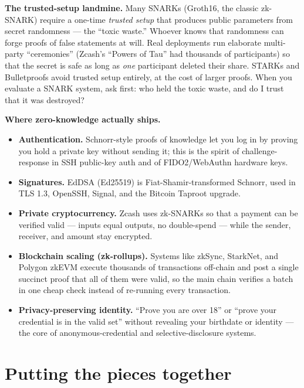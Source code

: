 \begin{trapbox}
\textbf{The trusted-setup landmine.} Many SNARKs (Groth16, the classic
zk-SNARK) require a one-time \emph{trusted setup} that produces public
parameters from secret randomness --- the ``toxic waste.'' Whoever knows that
randomness can forge proofs of false statements at will. Real deployments run
elaborate multi-party ``ceremonies'' (Zcash's ``Powers of Tau'' had thousands of
participants) so that the secret is safe as long as \emph{one} participant
deleted their share. STARKs and Bulletproofs avoid trusted setup entirely, at
the cost of larger proofs. When you evaluate a SNARK system, ask first: who held
the toxic waste, and do I trust that it was destroyed?
\end{trapbox}

\begin{applicationbox}
\textbf{Where zero-knowledge actually ships.}
\begin{itemize}
  \item \textbf{Authentication.} Schnorr-style proofs of knowledge let you log
  in by proving you hold a private key without sending it; this is the spirit of
  challenge-response in SSH public-key auth and of FIDO2/WebAuthn hardware keys.
  \item \textbf{Signatures.} EdDSA (Ed25519) is Fiat-Shamir-transformed Schnorr,
  used in TLS 1.3, OpenSSH, Signal, and the Bitcoin Taproot upgrade.
  \item \textbf{Private cryptocurrency.} Zcash uses zk-SNARKs so that a payment
  can be verified valid --- inputs equal outputs, no double-spend --- while the
  sender, receiver, and amount stay encrypted.
  \item \textbf{Blockchain scaling (zk-rollups).} Systems like zkSync,
  StarkNet, and Polygon zkEVM execute thousands of transactions off-chain and
  post a single succinct proof that all of them were valid, so the main chain
  verifies a batch in one cheap check instead of re-running every transaction.
  \item \textbf{Privacy-preserving identity.} ``Prove you are over 18'' or
  ``prove your credential is in the valid set'' without revealing your birthdate
  or identity --- the core of anonymous-credential and selective-disclosure
  systems.
\end{itemize}
\end{applicationbox}

\section{Putting the pieces together}
\label{ch31:summary}

